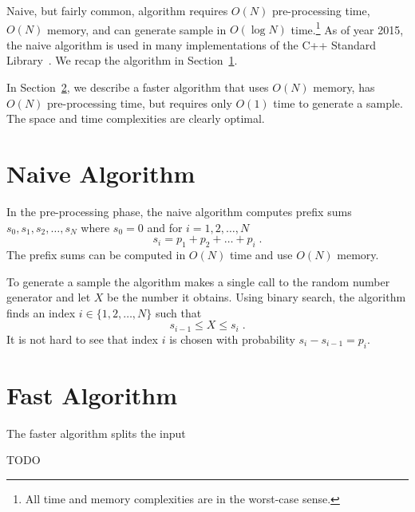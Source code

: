 \documentclass{article}
\begin{document}
Naive, but fairly common, algorithm requires $O(N)$ pre-processing time, $O(N)$
memory, and can generate sample in $O(\log N)$ time.\footnote{All time and
memory complexities are in the worst-case sense.} As of year 2015, the naive
algorithm is used in many implementations of the C++ Standard
Library~\cite{STL}.  We recap the algorithm in
Section~\ref{section:naive-algorithm}.

In Section~\ref{section:fast-algorithm}, we describe a faster algorithm that
uses $O(N)$ memory, has $O(N)$ pre-processing time, but requires only $O(1)$
time to generate a sample.  The space and time complexities are clearly
optimal.

\section{Naive Algorithm}
\label{section:naive-algorithm}

In the pre-processing phase, the naive algorithm computes prefix sums $s_0,
s_1, s_2, \dots, s_N$ where $s_0 = 0$ and for $i=1,2,\dots,N$
$$
s_i = p_1 + p_2 + \dots + p_i \; .
$$
The prefix sums can be computed in $O(N)$ time and use $O(N)$ memory.

To generate a sample the algorithm makes a single call to the random number
generator and let $X$ be the number it obtains. Using
binary search, the algorithm finds an index $i \in \{1,2,\dots,N\}$ such that
$$
s_{i-1} \le X \le s_i \; .
$$
It is not hard to see that index $i$ is chosen with probability $s_i - s_{i-1}
= p_i$.

\section{Fast Algorithm}
\label{section:fast-algorithm}

The faster algorithm splits the input

TODO
\end{document}
